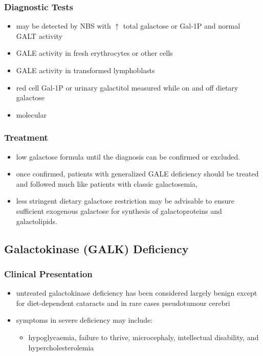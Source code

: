 \documentclass{scrartcl}
\begin{document}
\subsubsection{Diagnostic Tests}
\label{sec:orgb8169f8}
\begin{itemize}
\item may be detected by NBS with \(\uparrow\) total galactose or Gal-1P and normal GALT activity
\item GALE activity in fresh erythrocytes or other cells
\item GALE activity in transformed lymphoblasts
\item red cell Gal-1P or urinary galactitol measured while on and off dietary galactose
\item molecular
\end{itemize}

\subsubsection{Treatment}
\label{sec:orgff8cb7b}
\begin{itemize}
\item low galactose formula until the diagnosis can be confirmed or excluded.
\item once confirmed, patients with generalized GALE deficiency should be
treated and followed much like patients with classic galactosemia,
\item less stringent dietary galactose restriction may be advisable to
ensure sufficient exogenous galactose for synthesis of galactoproteins and galactolipids.
\end{itemize}
\subsection{Galactokinase (GALK) Deficiency}
\label{sec:orgabb768e}
\subsubsection{Clinical Presentation}
\label{sec:org813c2bf}
\begin{itemize}
\item untreated galactokinase deficiency has been considered largely
benign except for diet-dependent cataracts and in rare cases pseudotumour cerebri
\item symptoms in severe deficiency may include:
\begin{itemize}
\item hypoglycaemia, failure to thrive, microcephaly, intellectual
disability, and hypercholesterolemia
\end{itemize}
\end{itemize}
\end{document}
